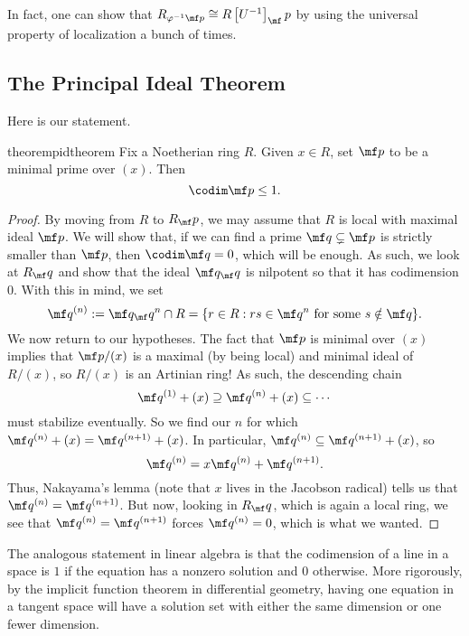 \begin{remark}
	In fact, one can show that $R_{\varphi^{-1}\mf p}\cong R\left[U^{-1}\right]_\mf p$ by using the universal property of localization a bunch of times.
\end{remark}

\subsection{The Principal Ideal Theorem}
Here is our statement.
\begin{restatable}{theorem}{pidtheorem}
	Fix a Noetherian ring $R$. Given $x\in R$, set $\mf p$ to be a minimal prime over $(x)$. Then
	\[\codim\mf p\le1.\]
\end{restatable}
\begin{proof}
	By moving from $R$ to $R_\mf p$, we may assume that $R$ is local with maximal ideal $\mf p$. We will show that, if we can find a prime $\mf q\subsetneq\mf p$ is strictly smaller than $\mf p$, then $\codim\mf q=0$, which will be enough. As such, we look at $R_\mf q$ and show that the ideal $\mf q_\mf q$ is nilpotent so that it has codimension $0$. With this in mind, we set
	\[\mf q^{(n)}:=\mf q_\mf q^n\cap R=\{r\in R:rs\in\mf q^n\text{ for some }s\notin\mf q\}.\]
	We now return to our hypotheses. The fact that $\mf p$ is minimal over $(x)$ implies that $\mf p/(x)$ is a maximal (by being local) and minimal ideal of $R/(x)$, %
	so $R/(x)$ is an Artinian ring! As such, the descending chain
	\[\mf q^{(1)}+(x)\supseteq\mf q^{(n)}+(x)\subseteq\cdots\]
	must stabilize eventually. So we find our $n$ for which $\mf q^{(n)}+(x)=\mf q^{(n+1)}+(x)$. In particular, $\mf q^{(n)}\subseteq\mf q^{(n+1)}+(x)$, so
	\[\mf q^{(n)}=x\mf q^{(n)}+\mf q^{(n+1)}.\]
	Thus, Nakayama's lemma (note that $x$ lives in the Jacobson radical) tells us that $\mf q^{(n)}=\mf q^{(n+1)}$. But now, looking in $R_\mf q$, which is again a local ring, we see that $\mf q^{(n)}=\mf q^{(n+1)}$ forces $\mf q^{(n)}=0$, which is what we wanted.
\end{proof}
\begin{remark}
	The analogous statement in linear algebra is that the codimension of a line in a space is $1$ if the equation has a nonzero solution and $0$ otherwise. More rigorously, by the implicit function theorem in differential geometry, having one equation in a tangent space will have a solution set with either the same dimension or one fewer dimension.
\end{remark}
